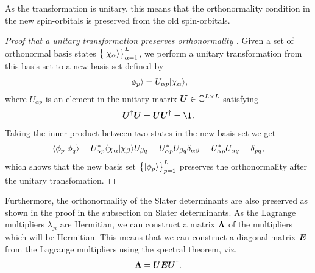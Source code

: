        As the transformation is unitary, this means that the orthonormality
        condition in the new spin-orbitals is preserved from the old
        spin-orbitals.
        \begin{proof}[%
                Proof that a unitary transformation preserves orthonormality%
        ]
            Given a set of orthonormal basis states
            $\left\{ | \chi_{\alpha} \rangle \right\}_{\alpha = 1}^{L}$,
            we perform a unitary transformation from this basis set to a new
            basis set defined by
            \begin{align}
                | \phi_p \rangle = U_{\alpha p}| \chi_{\alpha} \rangle,
            \end{align}
            where $U_{\alpha p}$ is an element in the unitary matrix $\boldsymbol{U} \in
            \mathbb{C}^{L \times L}$ satisfying
            \begin{align}
                \vfg{U}^{\dagger}\vfg{U} = \vfg{U}\vfg{U}^{\dagger} = \1.
            \end{align}
            Taking the inner product between two states in the new basis set we
            get
            \begin{align}
                \langle \phi_p | \phi_q \rangle
                = U^{*}_{\alpha p}
                \langle \chi_{\alpha} | \chi_{\beta} \rangle
                U_{\beta q}
                = U^{*}_{\alpha p} U_{\beta q} \delta_{\alpha \beta}
                = U^{*}_{\alpha p} U_{\alpha q}
                = \delta_{pq},
            \end{align}
            which shows that the new basis set $\left\{ | \phi_p \rangle \right\}_{p = 1}^L$
            preserves the orthonormality after the unitary transfomation.
        \end{proof}
        Furthermore, the orthonormality of the Slater determinants are also
        preserved as shown in the proof in the subsection on Slater determinants.
        As the Lagrange multipliers $\lambda_{ji}$ are Hermitian, we can
        construct a matrix $\boldsymbol{\Lambda}$ of the multipliers which will be
        Hermitian.
        This means that we can construct a diagonal matrix $\boldsymbol{E}$ from
        the Lagrange multipliers using the spectral theorem, viz.
        \begin{align}
            \boldsymbol{\Lambda} = \boldsymbol{U} \boldsymbol{E} \boldsymbol{U}^{\dagger}.
        \end{align}
